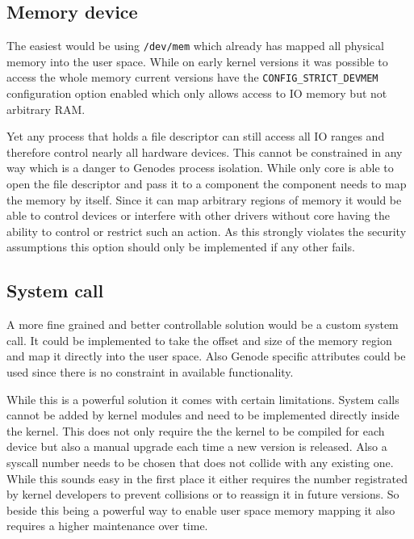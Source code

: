 \documentclass[
a4paper,
12pt,
notitlepage,
parskip=half,
DIV=11,
]{scrbook}
\begin{document}
		\subsection{Memory device}
		
		The easiest would be using \texttt{/dev/mem} which already has mapped all physical memory into the user space.
		While on early kernel versions it was possible to access the whole memory current versions have the \texttt{CONFIG\_STRICT\_DEVMEM} configuration option enabled which only allows access to IO memory but not arbitrary RAM.
		
		Yet any process that holds a file descriptor can still access all IO ranges and therefore control nearly all hardware devices.
		This cannot be constrained in any way which is a danger to Genodes process isolation.
		While only core is able to open the file descriptor and pass it to a component the component needs to map the memory by itself.
		Since it can map arbitrary regions of memory it would be able to control devices or interfere with other drivers without core having the ability to control or restrict such an action.
		As this strongly violates the security assumptions this option should only be implemented if any other fails. \citep{devmem} 
		
		\subsection{System call}
		
		A more fine grained and better controllable solution would be a custom system call.
		It could be implemented to take the offset and size of the memory region and map it directly into the user space.
		Also Genode specific attributes could be used since there is no constraint in available functionality.
		
		While this is a powerful solution it comes with certain limitations.
		System calls cannot be added by kernel modules and need to be implemented directly inside the kernel.
		This does not only require the the kernel to be compiled for each device but also a manual upgrade each time a new version is released.
		Also a syscall number needs to be chosen that does not collide with any existing one.
		While this sounds easy in the first place it either requires the number registrated by kernel developers to prevent collisions or to reassign it in future versions.
		So beside this being a powerful way to enable user space memory mapping it also requires a higher maintenance over time. \citep{syscall}
		
\end{document}

